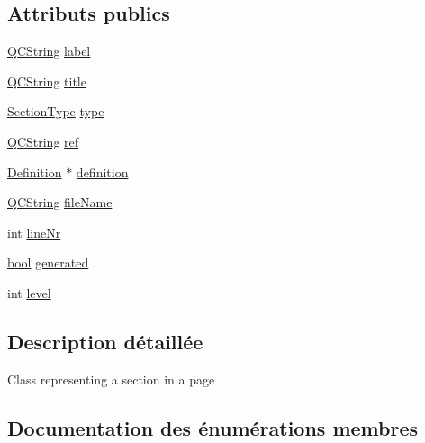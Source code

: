 \subsection*{Attributs publics}
\begin{DoxyCompactItemize}
\item 
\hyperlink{class_q_c_string}{Q\+C\+String} \hyperlink{struct_section_info_a3f1540ed748f49b622915063e97a0a9c}{label}
\item 
\hyperlink{class_q_c_string}{Q\+C\+String} \hyperlink{struct_section_info_a6351881d52095f7bbe11e96a7102f9a6}{title}
\item 
\hyperlink{struct_section_info_a32308f52dd59422b14fb75a92c90ebf1}{Section\+Type} \hyperlink{struct_section_info_a028667b2061a4cfa8a5ed9765e0583d2}{type}
\item 
\hyperlink{class_q_c_string}{Q\+C\+String} \hyperlink{struct_section_info_ad0f4c1f86263d2a044d2b5a183bb3387}{ref}
\item 
\hyperlink{class_definition}{Definition} $\ast$ \hyperlink{struct_section_info_aae5dcda2890356ecfcb2cd21f12c2ef7}{definition}
\item 
\hyperlink{class_q_c_string}{Q\+C\+String} \hyperlink{struct_section_info_a8973ffe375fd2b350a04f51f0785fd58}{file\+Name}
\item 
int \hyperlink{struct_section_info_ae57cb5b4a832c3768cf3f59fc1469846}{line\+Nr}
\item 
\hyperlink{qglobal_8h_a1062901a7428fdd9c7f180f5e01ea056}{bool} \hyperlink{struct_section_info_a6f1606b8414caf31008f55d8b33d4fcc}{generated}
\item 
int \hyperlink{struct_section_info_ac215add41d774d87dfd6a56acb4570c5}{level}
\end{DoxyCompactItemize}


\subsection{Description détaillée}
Class representing a section in a page 

\subsection{Documentation des énumérations membres}
\hypertarget{struct_section_info_a32308f52dd59422b14fb75a92c90ebf1}{}

